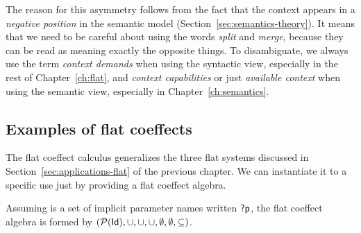 The reason for this asymmetry follows from the fact that the context appears in a \emph{negative
position} in the semantic model (Section~\ref{sec:semantics-theory}). It means that we need to be
careful about using the words \emph{split} and \emph{merge}, because they can be read as meaning
exactly the opposite things. To disambiguate, we always use the term \emph{context demands}
when using the syntactic view, especially in the rest of Chapter~\ref{ch:flat}, and
\emph{context capabilities} or just \emph{available context} when using the semantic view,
especially in Chapter~\ref{ch:semantics}.


\subsection{Examples of flat coeffects}
\label{sec:flat-calculus-examples}

The flat coeffect calculus generalizes the three flat systems discussed in
Section~\ref{sec:applications-flat} of the previous chapter. We can instantiate it to a specific
use just by providing a flat coeffect algebra.

\begin{example}
\label{ex:flat-impl}
Assuming  is a set of implicit parameter names written $\textnormal{\sffamily ?p}$, the flat coeffect
algebra is formed by $(\mathcal{P}(\textnormal{\sffamily Id}), \cup, \cup, \cup, \emptyset, \emptyset, \subseteq)$.
\end{example}

